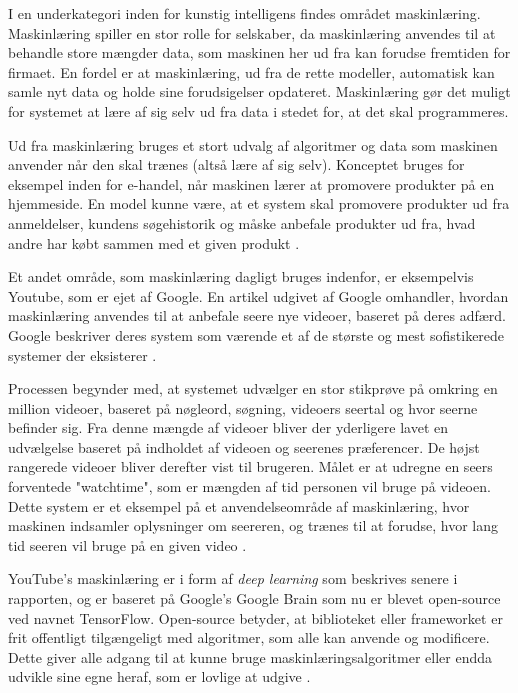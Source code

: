 I en underkategori inden for kunstig intelligens findes området maskinlæring. Maskinlæring spiller en stor rolle for selskaber, da maskinlæring anvendes til at behandle store mængder data, som maskinen her ud fra kan forudse fremtiden for firmaet. En fordel er at maskinlæring, ud fra de rette modeller, automatisk kan samle nyt data og holde sine forudsigelser opdateret. Maskinlæring gør det muligt for systemet at lære af sig selv ud fra data i stedet for, at det skal programmeres. 
\par
Ud fra maskinlæring bruges et stort udvalg af algoritmer og data som maskinen anvender når den skal trænes (altså lære af sig selv). Konceptet bruges for eksempel inden for e-handel, når maskinen lærer at promovere produkter på en hjemmeside. En model kunne være, at et system skal promovere produkter ud fra anmeldelser, kundens søgehistorik og måske anbefale produkter ud fra, hvad andre har købt sammen med et given produkt \cite{ML1}.
\par
Et andet område, som maskinlæring dagligt bruges indenfor, er eksempelvis Youtube, som er ejet af Google. En artikel udgivet af Google omhandler, hvordan maskinlæring anvendes til at anbefale seere nye videoer, baseret på deres adfærd. Google beskriver deres system som værende et af de største og mest sofistikerede systemer der eksisterer \cite{ML2}.
\par
Processen begynder med, at systemet udvælger en stor stikprøve på omkring en million videoer, baseret på nøgleord, søgning, videoers seertal og hvor seerne befinder sig. Fra denne mængde af videoer bliver der yderligere lavet en udvælgelse baseret på indholdet af videoen og seerenes præferencer. De højst rangerede videoer bliver derefter vist til brugeren. Målet er at udregne en seers forventede "watchtime", som er mængden af tid personen vil bruge på videoen. Dette system er et eksempel på et anvendelseområde af maskinlæring, hvor maskinen indsamler oplysninger om seereren, og trænes til at forudse, hvor lang tid seeren vil bruge på en given video \cite{ML2}.
\par
YouTube's maskinlæring er i form af \textit{deep learning} som beskrives senere i rapporten, og er baseret på Google's Google Brain som nu er blevet open-source ved navnet TensorFlow. Open-source betyder, at biblioteket eller frameworket er frit offentligt tilgængeligt med algoritmer, som alle kan anvende og modificere. Dette giver alle adgang til at kunne bruge maskinlæringsalgoritmer eller endda udvikle sine egne heraf, som er lovlige at udgive \cite{ML2}.
\par

